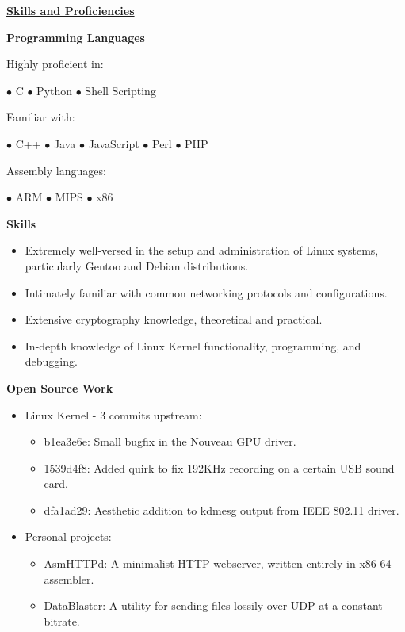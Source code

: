 \documentclass[11pt]{article}
\begin{document}
\noindent
\hrulefill

\centerline{\underline{\bf Skills and Proficiencies}}

\begin{multicols}{2}

\centerline{\bf Programming Languages}
\bigskip
\noindent Highly proficient in:\\
\centerline{\hfill $\bullet$ C \hfill $\bullet$ Python \hfill $\bullet$ Shell Scripting \hfill}
\noindent Familiar with:\\
\centerline{\hfill $\bullet$ C++ \hfill $\bullet$ Java \hfill $\bullet$ JavaScript \hfill $\bullet$ Perl \hfill $\bullet$ PHP \hfill}
\noindent Assembly languages:\\
\centerline{\hfill $\bullet$ ARM \hfill $\bullet$ MIPS \hfill $\bullet$ x86 \hfill}

\bigskip

\centerline{\bf Skills}
\begin{itemize}[leftmargin=*]
\itemsep 0em
	\item Extremely well-versed in the setup and administration of Linux systems, particularly Gentoo and Debian distributions.
	\item Intimately familiar with common networking protocols and configurations.
	\item Extensive cryptography knowledge, theoretical and practical.
	\item In-depth knowledge of Linux Kernel functionality, programming, and debugging.
\end{itemize}

\columnbreak

\centerline{\bf Open Source Work}
\begin{itemize}[leftmargin=*]
\itemsep 0em
	\item Linux Kernel - 3 commits upstream:
	\begin{itemize}
	\itemsep 0em
		\item b1ea3e6e: Small bugfix in the Nouveau GPU driver.
		\item 1539d4f8: Added quirk to fix 192KHz recording on a certain USB sound card.
		\item dfa1ad29: Aesthetic addition to kdmesg output from IEEE 802.11 driver.
	\end{itemize}
	\item Personal projects:
	\begin{itemize}
	\itemsep 0em
		\item AsmHTTPd: A minimalist HTTP webserver, written entirely in x86-64 assembler.
		\item DataBlaster: A utility for sending files lossily over UDP at a constant bitrate.
	\end{itemize}
\end{itemize}

\end{multicols}
\end{document}
